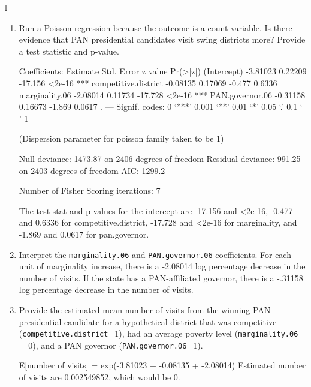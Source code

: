 l\documentclass[12pt,letterpaper]{article}
\begin{document}
\begin{enumerate}
	\item [(a)]
	Run a Poisson regression because the outcome is a count variable. Is there evidence that PAN presidential candidates visit swing districts more? Provide a test statistic and p-value.
	
	Coefficients:
										Estimate Std. Error z value Pr(>|z|)    
	(Intercept)         	 		-3.81023    0.22209 -17.156   <2e-16 ***
	competitive.district	  -0.08135    0.17069  -0.477   0.6336    
	marginality.06       		-2.08014    0.11734 -17.728   <2e-16 ***
	PAN.governor.06    		-0.31158    0.16673  -1.869   0.0617 .  
	---
	Signif. codes:  0 ‘***’ 0.001 ‘**’ 0.01 ‘*’ 0.05 ‘.’ 0.1 ‘ ’ 1
	
	(Dispersion parameter for poisson family taken to be 1)
	
	Null deviance: 1473.87  on 2406  degrees of freedom
	Residual deviance:  991.25  on 2403  degrees of freedom
	AIC: 1299.2
	
	Number of Fisher Scoring iterations: 7
	
	The test stat and p values for the intercept are -17.156 and  <2e-16, -0.477 and 0.6336  for competitive.district, -17.728 and <2e-16 for marginality, and -1.869 and 0.0617 for pan.governor.
	

	\item [(b)]
	Interpret the \texttt{marginality.06} and \texttt{PAN.governor.06} coefficients.
	For each unit of marginality increase, there is a -2.08014 log percentage decrease in the number of visits. If the state has a PAN-affiliated governor, there is a -.31158 log percentage decrease in the number of visits.
	
	\item [(c)]
	Provide the estimated mean number of visits from the winning PAN presidential candidate for a hypothetical district that was competitive (\texttt{competitive.district}=1), had an average poverty level (\texttt{marginality.06} = 0), and a PAN governor (\texttt{PAN.governor.06}=1).
	
	E[number of visits] = exp(-3.81023 + -0.08135 + -2.08014)
	Estimated number of visits are 0.002549852, which would be 0. 
\end{enumerate}
\end{document}
